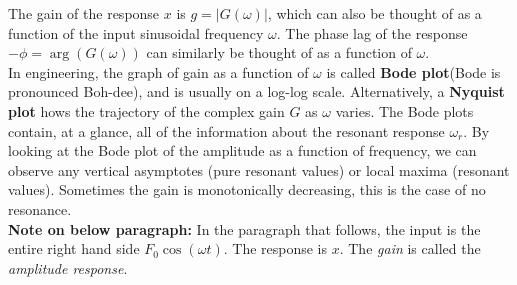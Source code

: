 The gain of the response $x$ is $g= |G(\omega )|$,
which can also be thought of as a function of the input sinusoidal frequency $\omega$.
The phase lag of the response $-\phi =\arg (G(\omega ))$
can similarly be thought of as a function of $\omega$. \\

In engineering, the graph of gain as a function of $\omega$ is called
\textbf{\color{blue} Bode plot}(Bode is pronounced Boh-dee), and is usually on a log-log scale.
Alternatively, a \textbf{\color{blue} Nyquist plot}
hows the trajectory of the complex gain $G$ as $\omega$ varies.
The Bode plots contain, at a glance, all of the information about the resonant response $\omega _r$.
By looking at the Bode plot of the amplitude as a function of frequency,
we can observe any vertical asymptotes (pure resonant values) or local maxima (resonant values).
Sometimes the gain is monotonically decreasing, this is the case of no resonance.\\

\textbf{\color{orange} Note on below paragraph: }
In the paragraph that follows, the input is the entire right hand side
$F_0 \cos (\omega t)$.
The response is $x$.
The \textit{gain} is called the \textit{amplitude response}. \\

